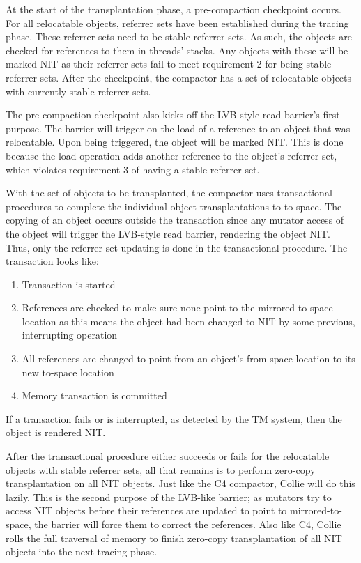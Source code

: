 \documentclass{sig-alternate}
\begin{document}
At the start of the transplantation phase, a pre-compaction checkpoint occurs.
For all relocatable objects, referrer sets have been established during the tracing phase.
These referrer sets need to be stable referrer sets. As such, the objects are checked for 
references to them in threads' stacks. Any objects with these will be 
marked NIT as their referrer sets fail to meet requirement 2 for being stable referrer sets.
After the checkpoint, the compactor has a set of relocatable objects with currently stable referrer sets.

The pre-compaction checkpoint also kicks off the LVB-style read barrier's first purpose. 
The barrier will trigger on the load of a reference to an object that was 
relocatable. Upon being triggered, the object will be marked NIT. This is done because
the load operation adds another reference to the object's referrer set, which violates
requirement 3 of having a stable referrer set.

With the set of objects to be transplanted, the compactor uses transactional
procedures to complete the individual object transplantations to to-space.
The copying of an object occurs outside the transaction since any
mutator access of the object will trigger the LVB-style read barrier,
rendering the object NIT. Thus, only the referrer set updating
is done in the transactional procedure. The transaction looks like:
\begin{enumerate}
\item Transaction is started
\item References are checked to make sure none point to the mirrored-to-space location as this means the object had been changed to NIT by some previous, interrupting operation
\item All references are changed to point from an object's from-space location to its new to-space location
\item Memory transaction is committed
\end{enumerate}
If a transaction fails or is interrupted, as detected by the TM system, then the object is rendered NIT.

After the transactional procedure either succeeds or fails for the 
relocatable objects with stable referrer sets, all that remains is to perform zero-copy transplantation
on all NIT objects. Just like the C4 compactor, Collie will do this lazily. This is the second purpose
of the LVB-like barrier; as mutators try to access NIT objects before their references are updated to
point to mirrored-to-space, the barrier will force them to correct the references. Also like C4, Collie
rolls the full traversal of memory to finish zero-copy transplantation of all NIT objects into the next
tracing phase.
\end{document}
